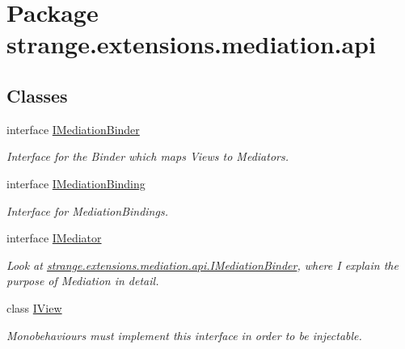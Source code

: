 \hypertarget{namespacestrange_1_1extensions_1_1mediation_1_1api}{\section{Package strange.\-extensions.\-mediation.\-api}
\label{namespacestrange_1_1extensions_1_1mediation_1_1api}
}
\subsection*{Classes}
\begin{DoxyCompactItemize}
\item 
interface \hyperlink{interfacestrange_1_1extensions_1_1mediation_1_1api_1_1_i_mediation_binder}{I\-Mediation\-Binder}
\begin{DoxyCompactList}\small\item\em Interface for the Binder which maps Views to Mediators. \end{DoxyCompactList}\item 
interface \hyperlink{interfacestrange_1_1extensions_1_1mediation_1_1api_1_1_i_mediation_binding}{I\-Mediation\-Binding}
\begin{DoxyCompactList}\small\item\em Interface for Mediation\-Bindings. \end{DoxyCompactList}\item 
interface \hyperlink{interfacestrange_1_1extensions_1_1mediation_1_1api_1_1_i_mediator}{I\-Mediator}
\begin{DoxyCompactList}\small\item\em Look at \hyperlink{interfacestrange_1_1extensions_1_1mediation_1_1api_1_1_i_mediation_binder}{strange.\-extensions.\-mediation.\-api.\-I\-Mediation\-Binder}, where I explain the purpose of Mediation in detail. \end{DoxyCompactList}\item 
class \hyperlink{interfacestrange_1_1extensions_1_1mediation_1_1api_1_1_i_view}{I\-View}
\begin{DoxyCompactList}\small\item\em Monobehaviours must implement this interface in order to be injectable. \end{DoxyCompactList}\end{DoxyCompactItemize}
